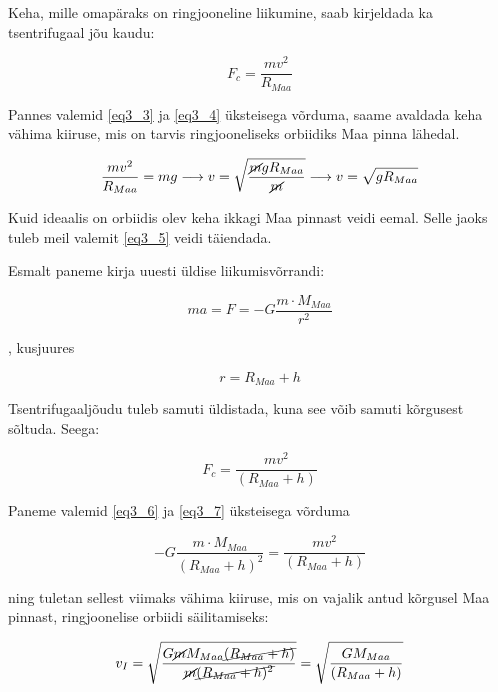 \begin{flushleft}
Keha, mille omapäraks on ringjooneline liikumine, saab kirjeldada ka tsentrifugaal jõu kaudu:

\begin{equation}
\label{eq3_4}
F_{c}=\dfrac{mv^{2}}{R_{Maa}}
\end{equation}

Pannes valemid \ref{eq3_3} ja \ref{eq3_4} üksteisega võrduma, saame avaldada keha vähima kiiruse, mis on tarvis ringjooneliseks orbiidiks Maa pinna lähedal.

\begin{equation}
\label{eq3_5}
\dfrac{mv^{2}}{R_{Maa}} = mg \longrightarrow v = \sqrt{\dfrac{\cancel{m}gR_{Maa}}{\cancel{m}}} \longrightarrow v= \sqrt{gR_{Maa}}
\end{equation}

Kuid ideaalis on orbiidis olev keha ikkagi Maa pinnast veidi eemal. Selle jaoks tuleb meil valemit \ref{eq3_5} veidi täiendada.

Esmalt paneme kirja uuesti üldise liikumisvõrrandi:

\begin{equation}
\label{eq3_6}
ma=F=-G\dfrac{m \cdot M_{Maa}}{r^{2}}
\end{equation}

, kusjuures

\begin{equation}
\label{eq3_7}
r=R_{Maa}+h
\end{equation}

Tsentrifugaaljõudu tuleb samuti üldistada, kuna see võib samuti kõrgusest sõltuda. Seega:

\begin{equation}
\label{eq3_8}
F_{c}=\dfrac{mv^{2}}{(R_{Maa}+h)}
\end{equation}

Paneme valemid \ref{eq3_6} ja \ref{eq3_7} üksteisega võrduma 

\begin{equation}
\label{eq3_9}
-G\dfrac{m \cdot M_{Maa}}{(R_{Maa}+h)^{2}} = \dfrac{mv^{2}}{(R_{Maa}+h)}
\end{equation}

ning tuletan sellest viimaks vähima kiiruse, mis on vajalik antud kõrgusel Maa pinnast, ringjoonelise orbiidi säilitamiseks:

\begin{equation}
\label{eq3_10}
v_{I}= \sqrt{\dfrac{G\cancel{m}M_{Maa}\cancel{(R_{Maa}+h)}}{\cancel{m}\cancel{(R_{Maa} + h)^{2}}}} = \sqrt{\dfrac{GM_{Maa}}{(R_{Maa}+h)}}
\end{equation}


\end{flushleft}
